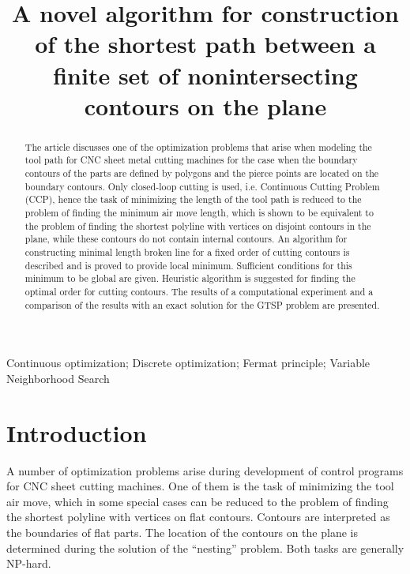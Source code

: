 \documentclass[]{interact}
\theoremstyle{plain}%
\theoremstyle{definition}
\theoremstyle{remark}
\begin{document}
\title{A novel algorithm for construction of the shortest path
between a finite set of nonintersecting contours on the plane}

\author{
}

\maketitle

\begin{abstract}
The article discusses one of the optimization problems
that arise when modeling the tool path for CNC sheet metal
cutting machines for the case when the boundary contours
of the parts are defined by polygons and the pierce points
are located on the boundary contours.
Only closed-loop cutting is used,
i.e. Continuous Cutting Problem (CCP),
hence
the task of minimizing the length of the tool path
is reduced to the problem of finding the minimum air move length,
which is shown to be equivalent to the problem of finding
the shortest polyline with vertices on disjoint contours in the plane,
while these contours do not contain internal contours.
An algorithm for constructing minimal length broken line
for a fixed order of cutting contours is described
and is proved to provide local minimum.
Sufficient conditions for this minimum to be global are given.
Heuristic algorithm is suggested for finding the optimal order for cutting contours.
The results of a computational experiment
and a comparison of the results with an exact solution for the GTSP problem are presented.

\end{abstract}

\begin{keywords}
  Continuous optimization;
  Discrete optimization;
  Fermat principle;
  Variable Neighborhood Search
\end{keywords}

\section{Introduction}

A number of optimization problems arise
during development of control programs for CNC sheet cutting machines.
One of them is
the task of minimizing the tool air move,
which in some special cases can be reduced
to the problem of finding the shortest polyline
with vertices on flat contours.
Contours are interpreted as the boundaries of flat parts.
The location of the contours on the plane is determined
during the solution of the ``nesting'' problem.
Both tasks are generally NP-hard.
\end{document}

